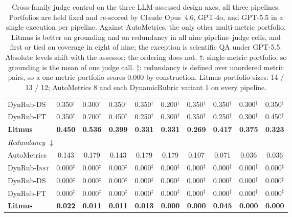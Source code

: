 \documentclass[11pt]{article}
\begin{document}
\begin{table}[t]
\begin{tabular}{l ccc ccc ccc}
DynRub-\textsc{DS}     & 0.350$^{\dagger}$ & 0.300$^{\dagger}$ & 0.350$^{\dagger}$ & 0.350$^{\dagger}$ & 0.200$^{\dagger}$ & 0.350$^{\dagger}$ & 0.350$^{\dagger}$ & 0.300$^{\dagger}$ & 0.350$^{\dagger}$ \\
DynRub-\textsc{FT}     & 0.350$^{\dagger}$ & 0.700$^{\dagger}$ & 0.450$^{\dagger}$ & 0.250$^{\dagger}$ & 0.300$^{\dagger}$ & 0.350$^{\dagger}$ & 0.250$^{\dagger}$ & 0.300$^{\dagger}$ & 0.450$^{\dagger}$ \\
\textbf{Litmus}        & \textbf{0.450} & \textbf{0.536} & \textbf{0.399} & \textbf{0.331} & \textbf{0.331} & \textbf{0.269} & \textbf{0.417} & \textbf{0.375} & \textbf{0.323} \\
\midrule
\multicolumn{10}{l}{\emph{Redundancy} $\downarrow$} \\
AutoMetrics            & 0.143 & 0.179 & 0.143 & 0.179 & 0.179 & 0.107 & 0.071 & 0.036 & 0.036 \\
DynRub-\textsc{Inst}   & 0.000$^{\ddagger}$ & 0.000$^{\ddagger}$ & 0.000$^{\ddagger}$ & 0.000$^{\ddagger}$ & 0.000$^{\ddagger}$ & 0.000$^{\ddagger}$ & 0.000$^{\ddagger}$ & 0.000$^{\ddagger}$ & 0.000$^{\ddagger}$ \\
DynRub-\textsc{DS}     & 0.000$^{\ddagger}$ & 0.000$^{\ddagger}$ & 0.000$^{\ddagger}$ & 0.000$^{\ddagger}$ & 0.000$^{\ddagger}$ & 0.000$^{\ddagger}$ & 0.000$^{\ddagger}$ & 0.000$^{\ddagger}$ & 0.000$^{\ddagger}$ \\
DynRub-\textsc{FT}     & 0.000$^{\ddagger}$ & 0.000$^{\ddagger}$ & 0.000$^{\ddagger}$ & 0.000$^{\ddagger}$ & 0.000$^{\ddagger}$ & 0.000$^{\ddagger}$ & 0.000$^{\ddagger}$ & 0.000$^{\ddagger}$ & 0.000$^{\ddagger}$ \\
\textbf{Litmus}        & \textbf{0.022} & \textbf{0.011} & \textbf{0.011} & \textbf{0.013} & \textbf{0.000} & \textbf{0.000} & \textbf{0.045} & \textbf{0.000} & \textbf{0.000} \\
\bottomrule
\end{tabular}
\caption{Cross-family judge control on the three LLM-assessed design axes, all three pipelines. Portfolios are held fixed and re-scored by Claude Opus~4.6, GPT-4o, and GPT-5.5 in a single execution per pipeline. Against AutoMetrics, the only other multi-metric portfolio, Litmus is better on grounding and on redundancy in all nine pipeline--judge cells, and first or tied on coverage in eight of nine; the exception is scientific QA under GPT-5.5. Absolute levels shift with the assessor; the ordering does not. $\dagger$: single-metric portfolio, so grounding is the mean of one judge call. $\ddagger$: redundancy is defined over unordered metric pairs, so a one-metric portfolio scores $0.000$ by construction. Litmus portfolio sizes: 14 / 13 / 12; AutoMetrics 8 and each DynamicRubric variant 1 on every pipeline.}
\label{tab:crossfamilyaxes}
\end{table}
\end{document}
